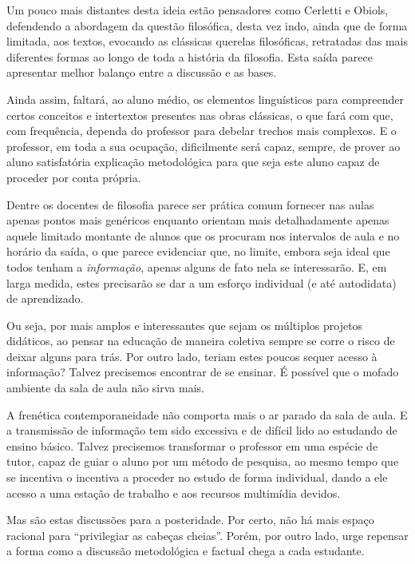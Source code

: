 \documentclass[12pt,a4paper]{article}
\begin{document}
	Um pouco mais distantes desta ideia estão pensadores como Cerletti e 
	Obiols, defendendo a abordagem da questão filosófica, desta vez 
	indo, ainda que de forma limitada, aos textos, evocando as clássicas 
	querelas filosóficas, retratadas das mais diferentes formas ao longo 
	de toda a história da filosofia. Esta saída parece apresentar 
	melhor balanço entre a discussão e as bases. 

	Ainda assim, faltará, 
	ao aluno médio, os elementos linguísticos para compreender certos 
	conceitos e intertextos presentes nas obras clássicas, o que fará 
	com que, com frequência, dependa do professor para debelar trechos 
	mais complexos. E o professor, em toda a sua ocupação, dificilmente 
	será capaz, sempre, de prover ao aluno satisfatória explicação 
	metodológica para que seja este aluno capaz de proceder por 
	conta própria. 

	Dentre os docentes de filosofia parece ser prática comum fornecer 
	nas aulas apenas pontos mais genéricos enquanto orientam mais 
	detalhadamente apenas aquele limitado montante de alunos que os 
	procuram nos intervalos de aula e no horário da saída, o que 
	parece evidenciar que, no limite, embora seja ideal que todos 
	tenham a \emph{informação}, apenas alguns de fato nela se 
	interessarão. E, em larga medida, estes precisarão se dar a um 
	esforço individual (e até autodidata) de aprendizado. 

	Ou seja, por mais amplos e interessantes que sejam os múltiplos 
	projetos didáticos, ao pensar na educação de maneira coletiva 
	sempre se corre o risco de deixar alguns para trás. Por outro 
	lado, teriam estes poucos sequer acesso à informação? Talvez 
	precisemos encontrar de se ensinar. É possível que o mofado 
	ambiente da sala de aula não sirva mais. 

	A frenética contemporaneidade não comporta mais o ar parado da 
	sala de aula. E a transmissão de informação tem sido excessiva e 
	de difícil lido ao estudando de ensino básico. Talvez precisemos 
	transformar o professor em uma espécie de tutor, capaz de guiar 
	o aluno por um método de pesquisa, ao mesmo tempo que se incentiva 
	o incentiva a proceder no estudo de forma individual, dando a ele 
	acesso a uma estação de trabalho e aos recursos multimídia devidos. 

	Mas são estas discussões para a posteridade. Por certo, não há 
	mais espaço racional para “privilegiar as cabeças cheias”. Porém, 
	por outro lado, urge repensar a forma como a discussão metodológica 
	e factual chega a cada estudante. 

	\newpage
	
	
	
\end{document}
